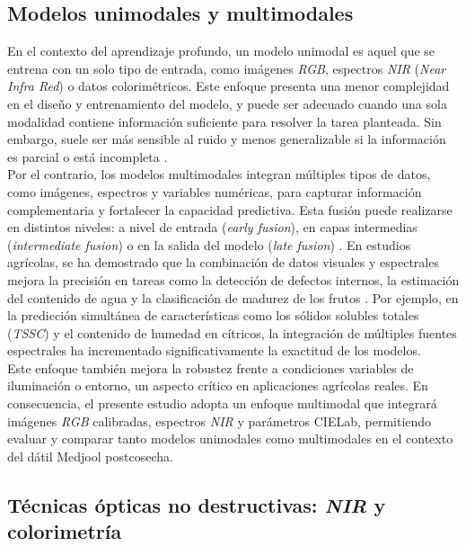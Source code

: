 \subsection{Modelos unimodales y multimodales}

En el contexto del aprendizaje profundo, un modelo unimodal es aquel que se entrena con un solo tipo de entrada, como imágenes \textit{\textit{RGB}}, espectros \textit{NIR} (\textit{Near Infra Red}) o datos colorimétricos. Este enfoque presenta una menor complejidad en el diseño y entrenamiento del modelo, y puede ser adecuado cuando una sola modalidad contiene información suficiente para resolver la tarea planteada. Sin embargo, suele ser más sensible al ruido y menos generalizable si la información es parcial o está incompleta \parencite{kamilaris_deep_2018}.\\

Por el contrario, los modelos multimodales integran múltiples tipos de datos, como imágenes, espectros y variables numéricas, para capturar información complementaria y fortalecer la capacidad predictiva. Esta fusión puede realizarse en distintos niveles: a nivel de entrada (\textit{early fusion}), en capas intermedias (\textit{intermediate fusion}) o en la salida del modelo (\textit{late fusion}) \parencite{passos_deep_2023}. En estudios agrícolas, se ha demostrado que la combinación de datos visuales y espectrales mejora la precisión en tareas como la detección de defectos internos, la estimación del contenido de agua y la clasificación de madurez de los frutos \parencite{passos_deep_2023, castillo-girones_artificial_2025}. Por ejemplo, en la predicción simultánea de características como los sólidos solubles totales (\textit{TSSC}) y el contenido de humedad en cítricos, la integración de múltiples fuentes espectrales ha incrementado significativamente la exactitud de los modelos.\\

Este enfoque también mejora la robustez frente a condiciones variables de iluminación o entorno, un aspecto crítico en aplicaciones agrícolas reales. En consecuencia, el presente estudio adopta un enfoque multimodal que integrará imágenes \textit{RGB} calibradas, espectros \textit{NIR} y parámetros CIELab, permitiendo evaluar y comparar tanto modelos unimodales como multimodales en el contexto del dátil Medjool postcosecha.

\subsection{Técnicas ópticas no destructivas: \textit{NIR} y colorimetría}

